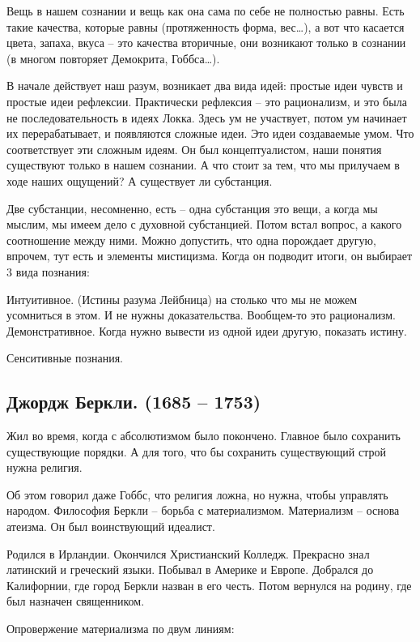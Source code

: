     Вещь в нашем сознании и вещь как она сама по себе не полностью равны. Есть такие качества, которые равны (протяженность форма, вес…), а вот что касается цвета, запаха, вкуса – это качества вторичные, они возникают только в сознании (в многом повторяет Демокрита, Гоббса…).

В начале действует наш разум, возникает два вида идей: простые идеи чувств и простые идеи рефлексии. Практически рефлексия – это рационализм, и это была не последовательность в идеях Локка. Здесь ум не участвует, потом ум начинает их перерабатывает, и появляются сложные идеи. Это идеи создаваемые умом. Что соответствует эти сложным идеям. Он был концептуалистом, наши понятия существуют только в нашем сознании. А что стоит за тем, что мы прилучаем в ходе наших ощущений? А существует ли субстанция.

    Две субстанции, несомненно, есть – одна субстанция это вещи, а когда мы мыслим, мы имеем дело с духовной субстанцией. Потом встал вопрос, а какого соотношение между ними. Можно допустить, что одна порождает другую, впрочем, тут есть и элементы мистицизма. Когда он подводит итоги, он выбирает 3 вида познания:

    Интуитивное. (Истины разума Лейбница) на столько что мы не можем усомниться в этом. И не нужны доказательства. Вообщем-то это рационализм.
    Демонстративное. Когда нужно вывести из одной идеи другую, показать истину.

    Сенситивные познания.

\subsection{Джордж Беркли. (1685 – 1753)}

Жил во время, когда с абсолютизмом было покончено. Главное было сохранить существующие порядки. А для того, что бы сохранить существующий строй нужна религия.

    Об этом говорил даже Гоббс, что религия ложна, но нужна, чтобы управлять народом. Философия Беркли – борьба с материализмом. Материализм – основа атеизма. Он был воинствующий идеалист.

Родился в Ирландии. Окончился Христианский Колледж. Прекрасно знал латинский и греческий языки. Побывал в Америке и Европе. Добрался до Калифорнии, где город Беркли назван в его честь. Потом вернулся на родину, где был назначен священником.

Опровержение материализма по двум линиям:

